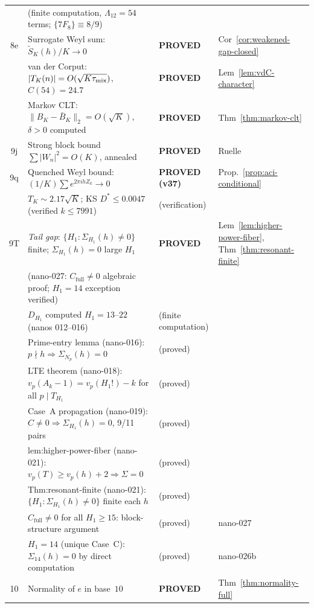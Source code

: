 \documentclass[
]{article}
\begin{document}
\begin{center}
\begin{tabular}{clll}
   & \quad (finite computation, $\Lambda_{12}=54$ terms; $\{7F_8\}\equiv 8/9$) & & \\
8e & Surrogate Weyl sum: $\tilde S_K(h)/K\to 0$ & \textbf{PROVED} & Cor~\ref{cor:weakened-gap-closed} \\
   & \quad van der Corput: $|T_K(n)|=O(\sqrt{K\tau_{\rm mix}})$, $C(54)=24.7$ & \textbf{PROVED} & Lem~\ref{lem:vdC-character} \\
   & \quad Markov CLT: $\|B_K-\bar B_K\|_2=O(\sqrt{K})$, $\delta>0$ computed & \textbf{PROVED} & Thm~\ref{thm:markov-clt} \\
9j & Strong block bound $\sum|W_n|^2=O(K)$, annealed & \textbf{PROVED} & Ruelle \cite{Ruelle76} \\
9q & Quenched Weyl bound: $(1/K)\sum e^{2\pi ihZ_k}\to 0$ & \textbf{PROVED (v37)} & Prop.~\ref{prop:aci-conditional} \\
   & \quad $T_K\sim 2.17\sqrt{K}$; KS $D^*\le 0.0047$ (verified $k\le 7991$) & (verification) & \\
9T & \emph{Tail gap}: $\{H_1:\Sigma_{H_1}(h)\ne 0\}$ finite; $\Sigma_{H_1}(h)=0$ large $H_1$ & \textbf{PROVED} & Lem~\ref{lem:higher-power-fiber}, Thm~\ref{thm:resonant-finite} \\
   & \quad (nano-027: $C_{\mathrm{full}}\ne 0$ algebraic proof; $H_1=14$ exception verified) & & \\
   & \quad $D_{H_1}$ computed $H_1=13$--$22$ (nanos 012--016) & (finite computation) & \\
   & \quad Prime-entry lemma (nano-016): $p\nmid h\Rightarrow\Sigma_{N_p}(h)=0$ & (proved) & \\
   & \quad LTE theorem (nano-018): $v_p(A_k-1)=v_p(H_1!)-k$ for all $p\mid T_{H_1}$ & (proved) & \\
   & \quad Case~A propagation (nano-019): $C\ne 0\Rightarrow\Sigma_{H_1}(h)=0$, 9/11 pairs & (proved) & \\
   & \quad lem:higher-power-fiber (nano-021): $v_p(T)\ge v_p(h)+2\Rightarrow\Sigma=0$ & (proved) & \\
   & \quad Thm:resonant-finite (nano-021): $\{H_1:\Sigma_{H_1}(h)\ne 0\}$ finite each $h$ & (proved) & \\
   & \quad $C_{\mathrm{full}}\ne 0$ for all $H_1\ge 15$: block-structure argument & (proved) & nano-027 \\
   & \quad $H_1=14$ (unique Case~C): $\Sigma_{14}(h)=0$ by direct computation & (proved) & nano-026b \\
10 & Normality of $e$ in base~$10$ & \textbf{PROVED} & Thm~\ref{thm:normality-full} \\

\end{tabular}
\end{center}
\end{document}
